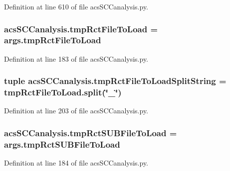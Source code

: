 Definition at line 610 of file acs\-S\-C\-Canalysis.\-py.

\hypertarget{a00097_aa2f655aa323f5eaef7509135b8af5722}{
\subsubsection[{tmp\-Rct\-File\-To\-Load}]{\setlength{\rightskip}{0pt plus 5cm}acs\-S\-C\-Canalysis.\-tmp\-Rct\-File\-To\-Load = args.\-tmp\-Rct\-File\-To\-Load}}\label{a00097_aa2f655aa323f5eaef7509135b8af5722}


Definition at line 183 of file acs\-S\-C\-Canalysis.\-py.

\hypertarget{a00097_add910e17b3f1fe61cdbaf8ce60ec0e20}{
\subsubsection[{tmp\-Rct\-File\-To\-Load\-Split\-String}]{\setlength{\rightskip}{0pt plus 5cm}tuple acs\-S\-C\-Canalysis.\-tmp\-Rct\-File\-To\-Load\-Split\-String = {\bf tmp\-Rct\-File\-To\-Load.\-split}(\char`\"{}\-\_\-\char`\"{})}}\label{a00097_add910e17b3f1fe61cdbaf8ce60ec0e20}


Definition at line 203 of file acs\-S\-C\-Canalysis.\-py.

\hypertarget{a00097_a8dd4ba8a8e597b56376879ba4cf1f41d}{
\subsubsection[{tmp\-Rct\-S\-U\-B\-File\-To\-Load}]{\setlength{\rightskip}{0pt plus 5cm}acs\-S\-C\-Canalysis.\-tmp\-Rct\-S\-U\-B\-File\-To\-Load = args.\-tmp\-Rct\-S\-U\-B\-File\-To\-Load}}\label{a00097_a8dd4ba8a8e597b56376879ba4cf1f41d}


Definition at line 184 of file acs\-S\-C\-Canalysis.\-py.

